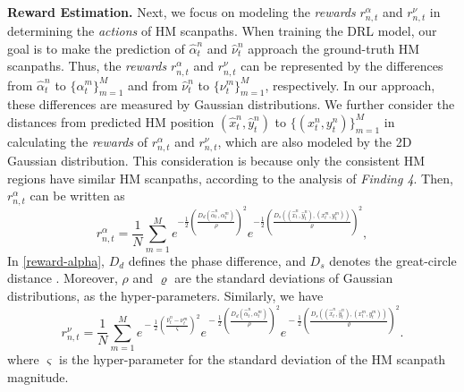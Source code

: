\documentclass[10pt,journal,compsoc]{IEEEtran}
\begin{document}
\textbf{Reward Estimation.}
Next, we focus on modeling the \textit{rewards} $r^{\alpha}_{n,t}$ and $r^{\nu}_{n,t}$ in determining the \textit{actions} of HM scanpaths.
When training the DRL model, our goal is to make the prediction of $\hat{\alpha}^n_{t}$ and $\hat{\nu}^n_{t}$ approach the ground-truth HM scanpaths.
Thus, the  \textit{rewards} $r^{\alpha}_{n,t}$ and $r^{\nu}_{n,t}$ can be represented by the differences from $\hat{\alpha}^n_{t}$  to $\{{\alpha}^m_{t}\}_{m=1}^M$ and from $\hat{\nu}^n_{t}$ to $\{{\nu}^m_{t}\}_{m=1}^M$, respectively.
In our approach, these differences are measured by Gaussian distributions.
We further consider the distances from predicted HM position $(\hat{x}^n_t,\hat{y}^n_t)$ to $\{(x^{n}_{t},y^{n}_{t})\}_{m=1}^M$ in calculating the \textit{rewards} of $r^{\alpha}_{n,t}$ and $r^{\nu}_{n,t}$, which are also modeled by the 2D Gaussian distribution.
This consideration is because only the consistent HM regions have similar HM scanpaths, according to the analysis of \textit{Finding 4}.
Then, $r^{\alpha}_{n,t}$ can be written as
\begin{equation}
\label{reward-alpha}
r^{\alpha}_{n,t} = \frac{1}{N}\sum_{m=1}^{M} e^{-\frac{1}{2}\left(\frac{D_d(\hat{\alpha}^n_{t}, \alpha^m_{t})}{\rho}\right)^2} e^{-\frac{1}{2}\left(\frac{D_s((\hat{x}^n_{t},\hat{y}^n_{t}),(x^m_{t},y^m_{t}))}{\varrho}\right)^2},
\end{equation}
In \eqref{reward-alpha}, $D_d$ defines the phase difference, and $D_s$ denotes the great-circle distance \cite{shumaker1984astronomical}. Moreover, $\rho$ and $\varrho$ are the standard deviations of Gaussian distributions, as the hyper-parameters. Similarly, we have
\begin{equation}
\label{reward-nu}
r^{\nu}_{n,t} \!\!=\!\! \frac{1}{N}\!\sum_{m=1}^{M}\!
e^{\!-\frac{1}{2}\left(\!{\frac{\hat{\nu}^n_{t}-\nu^{m}_{t}}{\varsigma}}\!\right)^2} \! e^{\!-\frac{1}{2}\left(\!\frac{D_d(\hat{\alpha}^n_{t}, \alpha^m_{t})}{\rho}\!\right)^2} \!\!e^{\!-\frac{1}{2}\left(\!\frac{D_s((\hat{x}^n_{t},\hat{y}^n_{t}),(x^m_{t},y^m_{t}))}{\varrho}\!\right)^2}.
\end{equation}
where $\varsigma$ is the hyper-parameter for the standard deviation of the HM scanpath magnitude.
\end{document}
